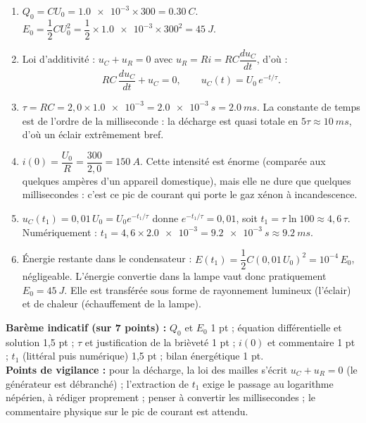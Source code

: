 \documentclass[11pt]{article}
\newcommand{\cle}[1]{{\popxbold\color{popdark}#1}}
\begin{document}
\begin{corrige}
\begin{enumerate}
\item $Q_0 = CU_0 = \num{1,0e-3}\times 300 = \SI{0,30}{C}$.\\
$E_0 = \dfrac{1}{2}CU_0^2 = \dfrac{1}{2}\times \num{1,0e-3}\times 300^2 = \SI{45}{J}$.
\item Loi d'additivité : $u_C + u_R = 0$ avec $u_R = Ri = RC\dfrac{du_C}{dt}$, d'où :
\[ RC\,\dfrac{du_C}{dt} + u_C = 0, \qquad u_C(t) = U_0\,e^{-t/\tau}. \]
\item $\tau = RC = 2,0\times \num{1,0e-3} = \SI{2,0e-3}{s} = \SI{2,0}{ms}$. La constante de temps est de l'ordre de la milliseconde : la décharge est quasi totale en $5\tau \approx \SI{10}{ms}$, d'où un éclair extrêmement bref.
\item $i(0) = \dfrac{U_0}{R} = \dfrac{300}{2,0} = \SI{150}{A}$. Cette intensité est énorme (comparée aux quelques ampères d'un appareil domestique), mais elle ne dure que quelques millisecondes : c'est ce pic de courant qui porte le gaz xénon à incandescence.
\item $u_C(t_1) = 0,01\,U_0 = U_0 e^{-t_1/\tau}$ donne $e^{-t_1/\tau} = 0,01$, soit $t_1 = \tau\ln 100 \approx 4,6\,\tau$. Numériquement : $t_1 = 4,6\times \num{2,0e-3} = \SI{9,2e-3}{s} \approx \SI{9,2}{ms}$.
\item Énergie restante dans le condensateur : $E(t_1) = \dfrac{1}{2}C(0,01\,U_0)^2 = 10^{-4}\,E_0$, négligeable. L'énergie convertie dans la lampe vaut donc pratiquement $E_0 = \SI{45}{J}$. Elle est transférée sous forme de \cle{rayonnement lumineux} (l'éclair) et de \cle{chaleur} (échauffement de la lampe).
\end{enumerate}
\textbf{Barème indicatif (sur 7 points) :} $Q_0$ et $E_0$ 1 pt ; équation différentielle et solution 1,5 pt ; $\tau$ et justification de la brièveté 1 pt ; $i(0)$ et commentaire 1 pt ; $t_1$ (littéral puis numérique) 1,5 pt ; bilan énergétique 1 pt.\\
\textbf{Points de vigilance :} pour la décharge, la loi des mailles s'écrit $u_C + u_R = 0$ (le générateur est débranché) ; l'extraction de $t_1$ exige le passage au logarithme népérien, à rédiger proprement ; penser à convertir les millisecondes ; le commentaire physique sur le pic de courant est attendu.
\end{corrige}
\end{document}
